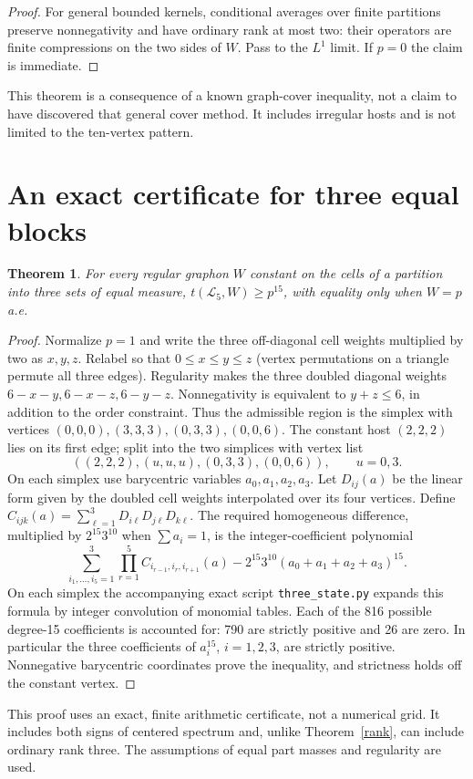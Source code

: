 \documentclass[11pt]{article}
\newtheorem{theorem}{Theorem}
\newcommand{\La}{\mathcal L}
\begin{document}
\begin{proof}
For general bounded kernels, conditional averages over finite partitions preserve nonnegativity and have ordinary rank at most two: their operators are finite compressions on the two sides of $W$. Pass to the $L^1$ limit. If $p=0$ the claim is immediate.
\end{proof}
This theorem is a consequence of a known graph-cover inequality, not a claim to have discovered that general cover method. It includes irregular hosts and is not limited to the ten-vertex pattern.

\section{An exact certificate for three equal blocks}
\begin{theorem}\label{three}
For every regular graphon $W$ constant on the cells of a partition into three sets of equal measure, $t(\La_5,W)\ge p^{15}$, with equality only when $W=p$ a.e.
\end{theorem}
\begin{proof}
Normalize $p=1$ and write the three off-diagonal cell weights multiplied by two as $x,y,z$. Relabel so that $0\le x\le y\le z$ (vertex permutations on a triangle permute all three edges). Regularity makes the three doubled diagonal weights $6-x-y,6-x-z,6-y-z$. Nonnegativity is equivalent to $y+z\le6$, in addition to the order constraint. Thus the admissible region is the simplex with vertices $(0,0,0),(3,3,3),(0,3,3),(0,0,6)$. The constant host $(2,2,2)$ lies on its first edge; split into the two simplices with vertex list
\[
 ((2,2,2),(u,u,u),(0,3,3),(0,0,6)),\qquad u=0,3.
\]
On each simplex use barycentric variables $a_0,a_1,a_2,a_3$. Let $D_{ij}(a)$ be the linear form given by the doubled cell weights interpolated over its four vertices. Define $C_{ijk}(a)=\sum_{\ell=1}^3D_{i\ell}D_{j\ell}D_{k\ell}$. The required homogeneous difference, multiplied by $2^{15}3^{10}$ when $\sum a_i=1$, is the integer-coefficient polynomial
\[
 \sum_{i_1,\ldots,i_5=1}^3 \prod_{r=1}^5 C_{i_{r-1},i_r,i_{r+1}}(a)
 -2^{15}3^{10}(a_0+a_1+a_2+a_3)^{15}.
\]
On each simplex the accompanying exact script \texttt{three\_state.py} expands this formula by integer convolution of monomial tables. Each of the 816 possible degree-15 coefficients is accounted for: 790 are strictly positive and 26 are zero. In particular the three coefficients of $a_i^{15}$, $i=1,2,3$, are strictly positive. Nonnegative barycentric coordinates prove the inequality, and strictness holds off the constant vertex.
\end{proof}
This proof uses an exact, finite arithmetic certificate, not a numerical grid. It includes both signs of centered spectrum and, unlike Theorem~\ref{rank}, can include ordinary rank three. The assumptions of equal part masses and regularity are used.
\end{document}
